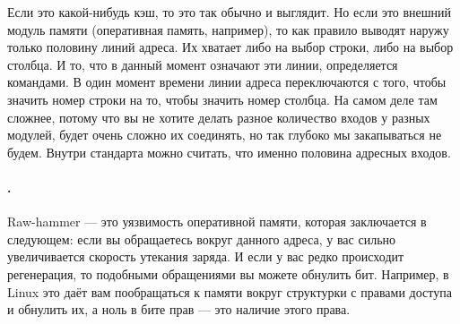 \documentclass{article}
\begin{document}
    \begin{center}
    \end{center}
    Если это какой-нибудь кэш, то это так обычно и выглядит. Но если это внешний модуль памяти (оперативная память, например), то как правило выводят наружу только половину линий адреса. Их хватает либо на выбор строки, либо на выбор столбца. И то, что в данный момент означают эти линии, определяется командами. В один момент времени линии адреса переключаются с того, чтобы значить номер строки на то, чтобы значить номер столбца. На самом деле там сложнее, потому что вы не хотите делать разное количество входов у разных модулей, будет очень сложно их соединять, но так глубоко мы закапываться не будем. Внутри стандарта можно считать, что именно половина адресных входов.
    \paragraph{.}
    Raw-hammer --- это уязвимость оперативной памяти, которая заключается в следующем: если вы обращаетесь вокруг данного адреса, у вас сильно увеличивается скорость утекания заряда. И если у вас редко происходит регенерация, то подобными обращениями вы можете обнулить бит. Например, в Linux это даёт вам пообращаться к памяти вокруг структурки с правами доступа и обнулить их, а ноль в бите прав --- это наличие этого права.
\end{document}
